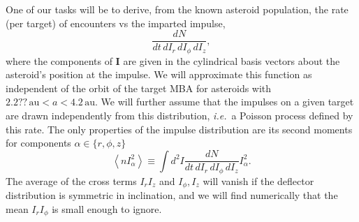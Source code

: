 \documentclass[linenumbers, onecolumn]{aastex631}
\newcommand{\AU}{\mathrm{au}}
\newcommand{\ie}{\textit{i.e.\/}}
\newcommand{\vecI}{\mathbf{I}}
\begin{document}
One of our tasks will be to derive, from the known asteroid population, the rate (per target) of encounters vs the imparted impulse,
\begin{equation}
  \frac{dN}{dt\,dI_r\,dI_\phi\,dI_z},
  \label{eq:dN}
\end{equation}
where the components of $\vecI$ are given in the cylindrical basis vectors about the asteroid's position at the impulse.
We will approximate this function as independent of the orbit of the target MBA for asteroids with $2.2??\,\AU < a < 4.2\,\AU.$  We will further assume that the impulses on a given target are drawn independently from this distribution, \ie\ a Poisson process defined by this rate.  The only properties of the impulse distribution are its second moments for components $\alpha \in \{r,\phi,z\}$
\begin{equation}
  \left \langle n I_\alpha^2 \right\rangle \equiv \int d^2I \frac{dN}{dt\,dI_r\,dI_\phi\,dI_z} I_\alpha^2.
\label{eq:nvsq}
\end{equation}
The average of the cross terms $I_rI_z$ and $I_\phi, I_z$ will vanish if the deflector distribution is symmetric in inclination, and we will find numerically that the mean $I_rI_\phi$ is small enough to ignore.
\end{document}
